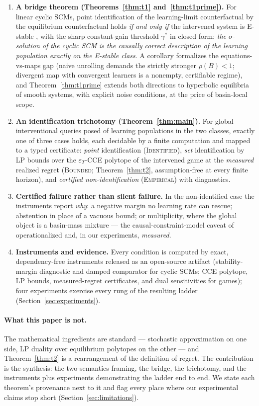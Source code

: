 \documentclass[pmlr]{jmlr}
\newcommand{\gstar}{\gamma^{*}}
\newcommand{\Cid}{\textsc{Identified}}
\newcommand{\Cbd}{\textsc{Bounded}}
\newcommand{\Cem}{\textsc{Empirical}}
\begin{document}
\begin{enumerate}
\item \textbf{A bridge theorem (Theorems~\ref{thm:t1} and~\ref{thm:t1prime}).} For linear cyclic
SCMs, point identification of the learning-limit counterfactual by the equilibrium counterfactual
holds \emph{if and only if} the intervened system is E-stable \citep{evans2001learning}, with the
sharp constant-gain threshold $\gstar$ in closed form: \emph{the $\sigma$-solution of the cyclic
SCM is the causally correct description of the learning population exactly on the E-stable
class}. A corollary formalizes the equations-vs-maps gap (naive unrolling demands the strictly
stronger $\rho(B)<1$; divergent map with convergent learners is a nonempty, certifiable regime),
and Theorem~\ref{thm:t1prime} extends both directions to hyperbolic equilibria of smooth systems,
with explicit noise conditions, at the price of basin-local scope.
\item \textbf{An identification trichotomy (Theorem~\ref{thm:main}).} For global interventional
queries posed of learning populations in the two classes, exactly one of three cases holds, each
decidable by a finite computation and mapped to a typed certificate: \emph{point} identification
(\Cid), \emph{set} identification by LP bounds over the $\varepsilon_T$-CCE polytope of the
intervened game at the \emph{measured} realized regret (\Cbd; Theorem~\ref{thm:t2},
assumption-free at every finite horizon), and \emph{certified non-identification} (\Cem) with
diagnostics.
\item \textbf{Certified failure rather than silent failure.} In the non-identified case the
instruments report \emph{why}: a negative margin no learning rate can rescue; abstention in
place of a vacuous bound; or multiplicity, where the global object is a basin-mass mixture ---
the causal-constraint-model caveat of \citet{blom2019beyond} operationalized and, in our
experiments, \emph{measured}.
\item \textbf{Instruments and evidence.} Every condition is computed by exact, dependency-free
instruments released as an open-source artifact (stability-margin diagnostic and damped
comparator for cyclic SCMs; CCE polytope, LP bounds, measured-regret certificates, and dual
sensitivities for games); four experiments exercise every rung of the resulting ladder
(Section~\ref{sec:experiments}).
\end{enumerate}

\paragraph{What this paper is not.} The mathematical ingredients are standard ---
stochastic approximation on one side, LP duality over equilibrium polytopes on the other --- and
Theorem~\ref{thm:t2} is a rearrangement of the definition of regret. The contribution is the
synthesis: the two-semantics framing, the bridge, the trichotomy, and the instruments plus
experiments demonstrating the ladder end to end. We state each theorem's provenance next to it
and flag every place where our experimental claims stop short (Section~\ref{sec:limitations}).
\end{document}
